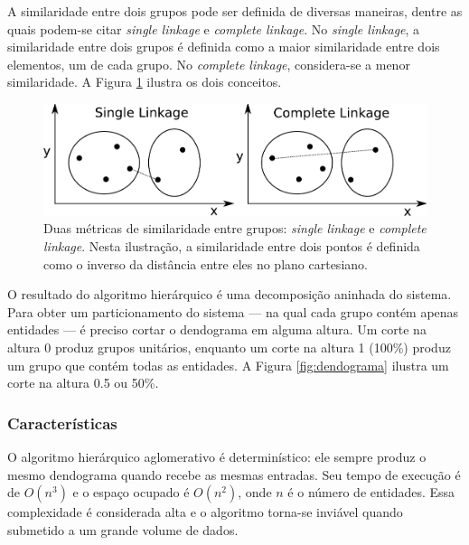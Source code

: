 A similaridade entre dois grupos pode ser definida de diversas maneiras,
dentre as quais podem-se citar \emph{single linkage} e \emph{complete
linkage}.
No \emph{single linkage}, a similaridade entre dois grupos é definida como
a maior similaridade entre dois elementos, um de cada grupo.
No \emph{complete linkage}, considera-se a menor similaridade.
A Figura \ref{fig:linkage} ilustra os dois conceitos.

\begin{figure}[ht] \label{fig:linkage}
\begin{centering}
  \includegraphics[width=1.0\textwidth]{fig_linkage}
  \caption{Duas métricas de similaridade entre grupos: 
    \emph{single linkage} e \emph{complete linkage}. Nesta ilustração,
    a similaridade entre dois pontos é definida como o inverso da distância
    entre eles no plano cartesiano.}
\end{centering}
\end{figure}

O resultado do algoritmo hierárquico é uma decomposição aninhada do sistema.
Para obter um particionamento do sistema --- na qual cada grupo contém
apenas entidades --- é preciso cortar o dendograma em alguma altura.
Um corte na altura 0 produz grupos unitários, enquanto um
corte na altura 1 (100\%) produz um grupo que contém todas as entidades.
A Figura \ref{fig:dendograma} ilustra um corte na altura 0.5 ou 50\%.

\subsubsection{Características}

O algoritmo hierárquico aglomerativo é determinístico: ele sempre produz o
mesmo dendograma quando recebe as mesmas entradas. Seu tempo de execução é
de $O(n^3)$ e o espaço ocupado é $O(n^2)$, onde $n$ é o número de entidades.
Essa complexidade é considerada alta e o algoritmo torna-se inviável quando
submetido a um grande volume de dados.

